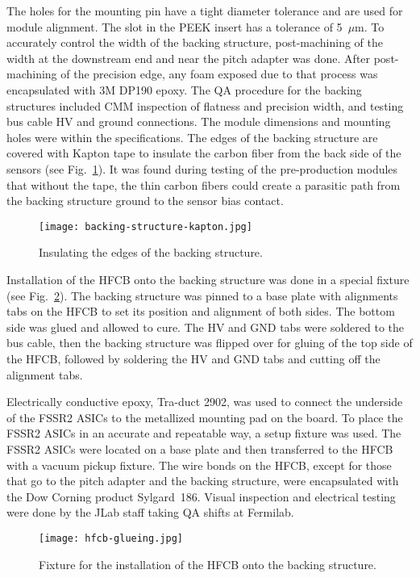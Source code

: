 The holes for the mounting pin have a tight diameter tolerance and are used for module alignment. The slot in the
PEEK insert has a tolerance of 5~$\mu$m. To accurately control the width of the backing structure, post-machining
of the width at the downstream end and near the pitch adapter was done. After post-machining of the precision
edge, any foam exposed due to that process was encapsulated with 3M DP190 epoxy. The QA procedure for the
backing structures included CMM inspection of flatness and precision width, and testing bus cable HV and ground
connections. The module dimensions and mounting holes were within the specifications. The edges of the backing
structure are covered with Kapton tape to insulate the carbon fiber from the back side of the sensors (see
Fig.~\ref{fig:backing-structure-kapton}). It was found during testing of the pre-production modules that without
the tape, the thin carbon fibers could create a parasitic path from the backing structure ground to the sensor bias
contact.

\begin{figure}[h] 
\centering 
\texttt{[image: backing-structure-kapton.jpg]}
\caption{Insulating the edges of the backing structure.}
\label{fig:backing-structure-kapton}
\end{figure}

Installation of the HFCB onto the backing structure was done in a special fixture (see Fig.~\ref{fig:hfcb-glueing}).
The backing structure was pinned to a base plate with alignments tabs on the HFCB to set its position and alignment of
both sides. The bottom side was glued and allowed to cure. The HV and GND tabs were soldered to the bus cable, then
the backing structure was flipped over for gluing of the top side of the HFCB, followed by soldering the HV and GND
tabs and cutting off the alignment tabs. 

Electrically conductive epoxy, Tra-duct 2902, was used to connect the underside of the FSSR2 ASICs to the
metallized mounting pad on the board. To place the FSSR2 ASICs in an accurate and repeatable way, a setup fixture
was used. The FSSR2 ASICs were located on a base plate and then transferred to the HFCB with a vacuum pickup
fixture. The wire bonds on the HFCB, except for those that go to the pitch adapter and the backing structure, were
encapsulated with the Dow Corning product Sylgard~186. Visual inspection and electrical testing were done by the
JLab staff taking QA shifts at Fermilab.

\begin{figure}[h] 
\centering 
\texttt{[image: hfcb-glueing.jpg]}
\caption{Fixture for the installation of the HFCB onto the backing structure.}
\label{fig:hfcb-glueing}
\end{figure}

